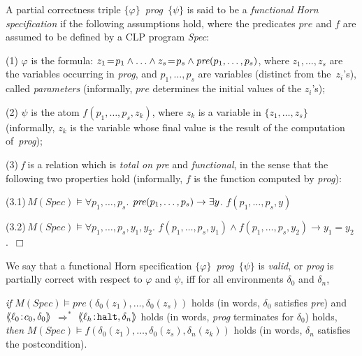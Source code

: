 \documentclass[english]{tlp}
\newcommand{\aaL}{\langle{\hspace*{-2.5pt}}\langle}
\newcommand{\aaR}{\rangle{\hspace*{-2.5pt}}\rangle}
\newcommand{\eop}{\hfill$\Box$}
\begin{document}
\begin{definition}\label{def:spec} 
{\rm 
A partial correctness triple
\mbox{$\{\varphi\} $ {\textit{prog}} $
\{\psi\}$} is said to be a {\it functional Horn specification} if the following 
assumptions hold, where the predicates $\textit{pre}$ and $f$ are 
assumed to be defined by a CLP program \textit{Spec\/}:

\noindent\hangindent=4mm
(1) $\varphi$ is the formula: 
$z_{1}\!=\!p_1\wedge\ldots \wedge z_{s}\!=\!p_s 
\wedge \textit{pre\/}(p_1,\ldots,p_s)$,
where $z_{1},\ldots, z_{s}$ are the variables occurring in \textit{prog}, and
 $p_1,\ldots,p_s$ are variables (distinct from the~$z_{i}$'s), called
{\it parameters} (informally,  $\textit{pre}$ determines the 
initial values of the $z_{i}$'s); 

\noindent\hangindent=4mm
(2)  $\psi$ is the atom $f(p_1,\ldots,p_s,z_k)$, 
where $z_{k}$ is a variable in $\{z_{1},\ldots, z_{s}\}$ (informally, 
$z_{k}$ is the variable whose final value is the result of 
the computation of~\textit{prog});

\noindent\hangindent=4mm
(3) \textit{f}\/ is a relation which is  {\it total on pre\/} and {\it functional}, in the sense that 
the following two properties hold (informally, $f$ is the function
computed by \textit{prog}):

(3.1)\,$M(\textit{Spec})\! \models \forall p_1,\ldots,p_s$.
$\textit{pre\/}(p_1,\ldots,p_s) 
\rightarrow \exists y$. $f(p_1,\ldots,p_s,y) $\nopagebreak

(3.2)\,$M(\textit{Spec})\! \models 
\forall p_1,\ldots,p_s,y_1,y_2$. $f(p_1,\ldots,p_s,y_1) 
\wedge f(p_1,\ldots,p_s,y_2)\! \rightarrow \!y_1\!=\!y_2$.~\eop
}\vspace*{-1mm}
\end{definition}

\noindent
We say that a functional Horn 
specification \mbox{$\{\varphi\} $ {\textit{prog}} $
\{\psi\}$} 
is {\it valid\/}, or \textit{prog} is 
partially correct with respect to $\varphi$ and $\psi$, iff
for all environments
$\delta_{{0}}$ and $\delta_{n}$,

\noindent 
{\it if} $M(\textit{Spec})\!\models \textit{pre}(\delta_{{0}}(z_{1}\!),
\ldots,
\delta_{{0}}(z_{s}))$ holds (in words,  $\delta_0$ satisfies \textit{pre}) 
and $\aaL \ell_{0}\!:\!c_{0}, 
 \delta_{{0}}\aaR$ $\Longrightarrow ^*$
\mbox{$\aaL \ell_{h}\!:\!{\mathtt{halt}},  \delta_{n}\aaR$} holds (in words, 
\textit{prog} terminates for $\delta_0$) holds, 
{\it then} $M(\textit{Spec})\models f(\delta_{{0}}(z_{1}),\ldots,\delta_{{0}}(z_{s}),\delta_{n}(z_k))$ holds (in words, $\delta_{n}$ satisfies the postcondition).
\end{document}

